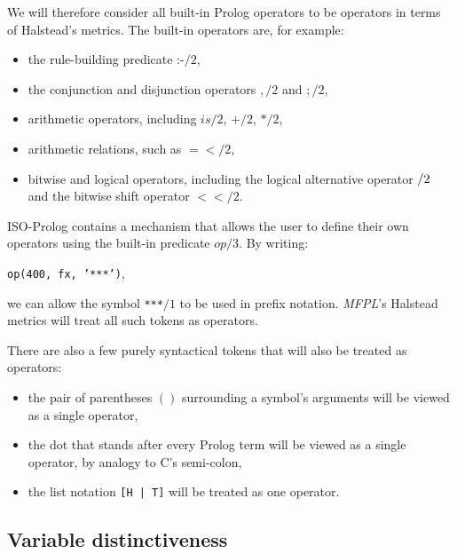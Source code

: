\documentclass[11pt,a4paper,twoside]{article}
\newcommand{\pname}{\emph{MFPL}}
\begin{document}
\begin{multicols}{2}
We will therefore consider all built-in Prolog operators to be
operators in terms of Halstead's metrics. The built-in operators are,
for example:
\begin{itemize}
\item the rule-building predicate :-$/2$,
\item the conjunction and disjunction operators $,/2$ and $;/2$,
\item arithmetic operators, including $is/2$, $+/2$, $*/2$, 
\item arithmetic relations, such as $=</2$, 
\item bitwise and logical operators, including the logical alternative
  operator $\//2$ and the bitwise shift operator $<</2$.
\end{itemize}

ISO-Prolog contains a mechanism that allows the user to define their
own operators using the built-in predicate $op/3$. By writing: 
\begin{center}
\texttt{op(400, fx, '***')},
\end{center}
 we can allow the symbol \texttt{***}$/1$ to be used in prefix
notation. \pname's Halstead metrics will treat all such tokens as
operators.

There are also a few purely syntactical tokens that will also be
treated as operators:
\begin{itemize}
\item the pair of parentheses $()$ surrounding a symbol's arguments
  will be viewed as a single operator,
\item the dot that stands after every Prolog term will be viewed as a
  single operator, by analogy to C's semi-colon,
\item the list notation \texttt{[H | T]} will be treated as one
  operator.
\end{itemize}

\subsection{Variable distinctiveness}


\end{multicols}
\end{document}
